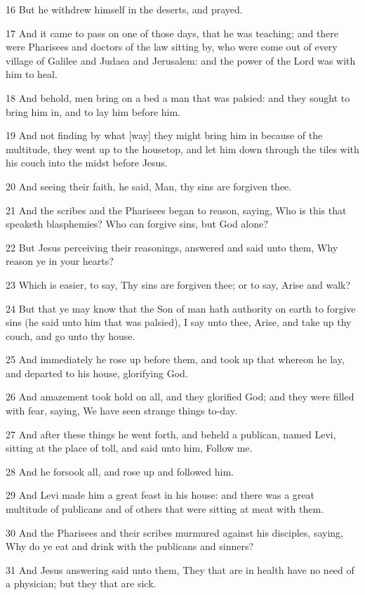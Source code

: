 \par 16 But he withdrew himself in the deserts, and prayed.
\par 17 And it came to pass on one of those days, that he was teaching; and there were Pharisees and doctors of the law sitting by, who were come out of every village of Galilee and Judaea and Jerusalem: and the power of the Lord was with him to heal.
\par 18 And behold, men bring on a bed a man that was palsied: and they sought to bring him in, and to lay him before him.
\par 19 And not finding by what [way] they might bring him in because of the multitude, they went up to the housetop, and let him down through the tiles with his couch into the midst before Jesus.
\par 20 And seeing their faith, he said, Man, thy sins are forgiven thee.
\par 21 And the scribes and the Pharisees began to reason, saying, Who is this that speaketh blasphemies? Who can forgive sins, but God alone?
\par 22 But Jesus perceiving their reasonings, answered and said unto them, Why reason ye in your hearts?
\par 23 Which is easier, to say, Thy sins are forgiven thee; or to say, Arise and walk?
\par 24 But that ye may know that the Son of man hath authority on earth to forgive sins (he said unto him that was palsied), I say unto thee, Arise, and take up thy couch, and go unto thy house.
\par 25 And immediately he rose up before them, and took up that whereon he lay, and departed to his house, glorifying God.
\par 26 And amazement took hold on all, and they glorified God; and they were filled with fear, saying, We have seen strange things to-day.
\par 27 And after these things he went forth, and beheld a publican, named Levi, sitting at the place of toll, and said unto him, Follow me.
\par 28 And he forsook all, and rose up and followed him.
\par 29 And Levi made him a great feast in his house: and there was a great multitude of publicans and of others that were sitting at meat with them.
\par 30 And the Pharisees and their scribes murmured against his disciples, saying, Why do ye eat and drink with the publicans and sinners?
\par 31 And Jesus answering said unto them, They that are in health have no need of a physician; but they that are sick.
